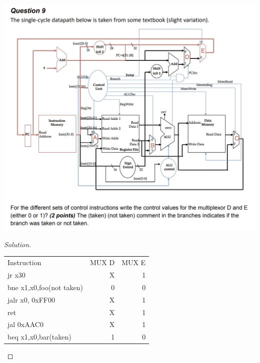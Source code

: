 \documentclass[12pt]{article}
\begin{document}
\includegraphics[scale=0.35]{9.png}
\begin{proof}[Solution]
	\centering
	\begin{tabular}{lrr}
		Instruction & \multicolumn{1}{l}{MUX D} & \multicolumn{1}{l}{MUX E} \\
		jr x30 & X     & 1 \\
		bne x1,x0,foo(not taken) & 0     & 0 \\
		jalr x0, 0xFF00 & X      & 1 \\
		ret   & X     & 1 \\
		jal 0xAAC0 & X     & 1 \\
		beq x1,x0,bar(taken) & 1     & 0 \\
	\end{tabular}%
\end{proof}
\bigskip
\end{document}
